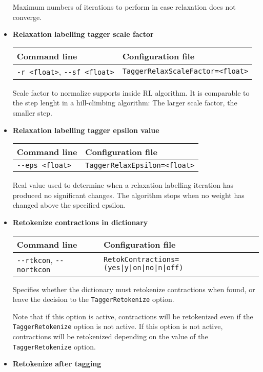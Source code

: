 \documentclass[a4paper]{book}
\begin{document}
\begin{itemize}
   Maximum numbers of iterations to perform in case relaxation does
   not converge.

\item {\bf Relaxation labelling tagger scale factor}

\begin{tabular}{|l|l|}
Command line       & Configuration file   \\ \hline
\verb#-r <float>#, \verb#--sf <float>#   & \verb#TaggerRelaxScaleFactor=<float>#  \\ \hline
\end{tabular}

   Scale factor to normalize supports inside RL algorithm. It is
   comparable to the step lenght in a hill-climbing algorithm: The
   larger scale factor, the smaller step.

\item {\bf Relaxation labelling tagger epsilon value}

\begin{tabular}{|l|l|}
Command line       & Configuration file   \\ \hline
\verb#--eps <float>#   & \verb#TaggerRelaxEpsilon=<float>#  \\ \hline
\end{tabular}

   Real value used to determine when a relaxation labelling iteration
   has produced no significant changes. The algorithm stops when no
   weight has changed above the specified epsilon.


\item {\bf Retokenize contractions in dictionary}

\begin{tabular}{|l|l|}
Command line       & Configuration file   \\ \hline
\verb#--rtkcon#, \verb#--nortkcon#    & \verb#RetokContractions=(yes|y|on|no|n|off)#    \\ \hline
\end{tabular}

   Specifies whether the dictionary must retokenize contractions when found, 
   or leave the decision to the \verb#TaggerRetokenize# option.

   Note that if this option is active, contractions will be
   retokenized even if the \verb#TaggerRetokenize# option is not
   active.  If this option is not active, contractions will be
   retokenized depending on the value of the \verb#TaggerRetokenize#
   option.


\item {\bf Retokenize after tagging}


\end{itemize}
\end{document}
